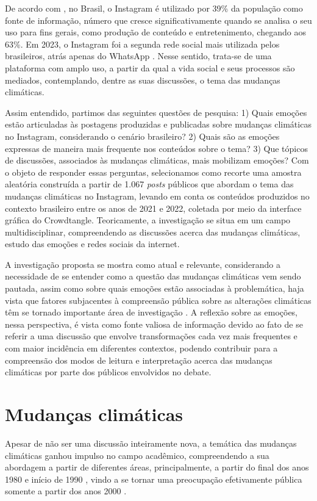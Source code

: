 \documentclass[portuguese]{textolivre}
\begin{document}
De acordo com \textcite{newman2023reuters}, no Brasil, o Instagram é utilizado por 39\% da população como fonte de informação, número que cresce significativamente quando se analisa o seu uso para fins gerais, como produção de conteúdo e entretenimento, chegando aos 63\%. Em 2023, o Instagram foi a segunda rede social mais utilizada pelos brasileiros, atrás apenas do WhatsApp \cite{bianchi2024socialmedia}. Nesse sentido, trata-se de uma plataforma com amplo uso, a partir da qual a vida social e seus processos são mediados, contemplando, dentre as suas discussões, o tema das mudanças climáticas.

Assim entendido, partimos das seguintes questões de pesquisa: 1) Quais emoções estão articuladas às postagens produzidas e publicadas sobre mudanças climáticas no Instagram, considerando o cenário brasileiro? 2) Quais são as emoções expressas de maneira mais frequente nos conteúdos sobre o tema? 3) Que tópicos de discussões, associados às mudanças climáticas, mais mobilizam emoções? Com o objeto de responder essas perguntas, selecionamos como recorte uma amostra aleatória construída a partir de 1.067 \textit{posts} públicos que abordam o tema das mudanças climáticas no Instagram, levando em conta os conteúdos produzidos no contexto brasileiro entre os anos de 2021 e 2022, coletada por meio da interface gráfica do Crowdtangle. Teoricamente, a investigação se situa em um campo multidisciplinar, compreendendo as discussões acerca das mudanças climáticas, estudo das emoções e redes sociais da internet.

A investigação proposta se mostra como atual e relevante, considerando a necessidade de se entender como a questão das mudanças climáticas vem sendo pautada, assim como sobre quais emoções estão associadas à problemática, haja vista que fatores subjacentes à compreensão pública sobre as alterações climáticas têm se tornado importante área de investigação \cite{lu2015incidental}. A reflexão sobre as emoções, nessa perspectiva, é vista como fonte valiosa de informação devido ao fato de se referir a uma discussão que envolve transformações cada vez mais frequentes e com maior incidência em diferentes contextos, podendo contribuir para a compreensão dos modos de leitura e interpretação acerca das mudanças climáticas por parte dos públicos envolvidos no debate.

\section{Mudanças climáticas}\label{sec-normas}
Apesar de não ser uma discussão inteiramente nova, a temática das mudanças climáticas ganhou impulso no campo acadêmico, compreendendo a sua abordagem a partir de diferentes áreas, principalmente, a partir do final dos anos 1980 e início de 1990 \cite{chakrabarty2009climate}, vindo a se tornar uma preocupação efetivamente pública somente a partir dos anos 2000 \cite{fleury2019mudancas}.
\end{document}
